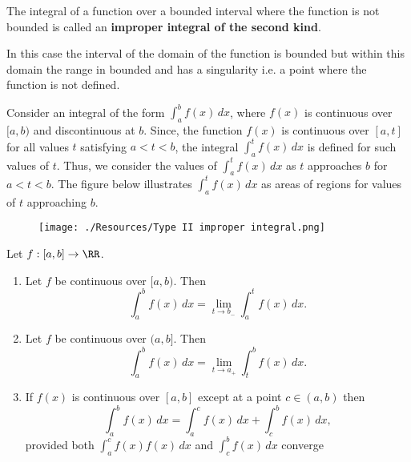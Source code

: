 \documentclass[12pt, a4paper]{article}
\begin{document}
\begin{definition}
    The integral of a function over a bounded interval where the function is not bounded is called an \textbf{improper integral of the second kind}.
\end{definition}

\begin{mdnote}
    In this case the interval of the domain of the function is bounded but within this domain the range in bounded and has a singularity i.e. a point where the function is not defined.
\end{mdnote}

Consider an integral of the form \(\int_{a}^{b} f(x) \, dx\), where \(f(x)\) is continuous over \([a,b)\) and discontinuous at \(b\). Since, the function \(f(x)\) is continuous over \([a,t]\) for all values \(t\) satisfying \(a<t<b\), the integral \(\int_{a}^{t} f(x) \, dx\) is defined for such values of \(t\). Thus, we consider the values of \(\int_{a}^{t} f(x)\, dx\) as \(t\) approaches \(b\) for \(a<t<b\). The figure below illustrates \(\int_{a}^{t} f(x) \, dx\) as areas of regions for values of \(t\) approaching \(b\).

\begin{figure}[H]
     \begin{center}
            \texttt{[image: ./Resources/Type II improper integral.png]}
     \end{center}
\end{figure}


\begin{definition}
    Let \(f : [a,b]\to \RR\).
    \begin{enumerate}
        \item Let \(f\) be continuous over \([a,b)\). Then
        \[\int_{a}^{b} f(x) \, dx = \lim_{t\to b_-} \int_{a}^{t} f(x) \, dx.\]
        \item Let \(f\) be continuous over \((a,b]\). Then
        \[\int_{a}^{b} f(x) \, dx = \lim_{t\to a_+} \int_{t}^{b} f(x) \, dx.\]
        \item If \(f(x)\) is continuous over \([a,b]\) except at a point \(c \in (a,b)\) then 
        \[\int_{a}^{b} f(x) \, dx =\int_{a}^{c} f(x)  \, dx +\int_{c}^{b} f(x) \, dx,\]
        provided both \(\int_{a}^{c} f(x) f(x) \, dx\) and \(\int_{c}^{b} f(x) \, dx\) converge 
    \end{enumerate}
\end{definition}
\end{document}
